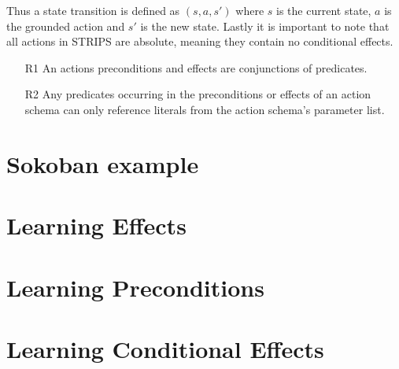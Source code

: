 \documentclass[master.tex]{subfiles}
\begin{document}
Thus a state transition is defined as $(s,a,s')$ where $s$ is the
current state, $a$ is the grounded action and $s'$ is the new state.
Lastly it is important to note that all actions in STRIPS are absolute,
meaning they contain no conditional effects.

\begin{enumerate}
    \item[R1] An actions preconditions and effects are conjunctions of predicates.
    \item[R2] Any predicates occurring in the preconditions or effects of an action schema can only reference literals from the action schema's parameter list.
\end{enumerate}

\section{Sokoban example}


\section{Learning Effects}


\section{Learning Preconditions}


\section{Learning Conditional Effects}

\end{document}
